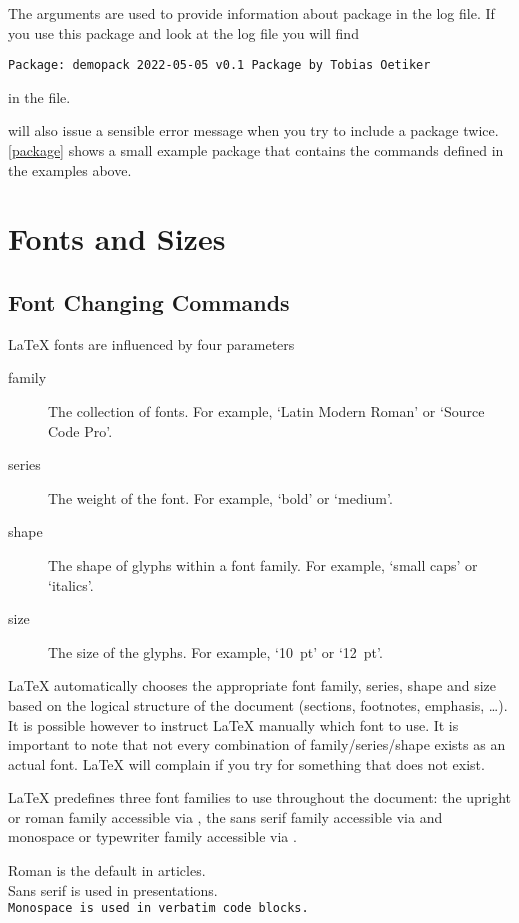 The arguments are used to provide information about package in the log file. If
you use this package and look at the log file you will find
\begin{verbatim}
Package: demopack 2022-05-05 v0.1 Package by Tobias Oetiker
\end{verbatim}
in the  file.

 will also issue a sensible error message when you try
to include a package twice. \autoref{package} shows a small example package
that contains the commands defined in the examples above.

\section{Fonts and Sizes}\label{sec:fontsize}

\subsection{Font Changing Commands}

\LaTeX{} fonts are influenced by four parameters
\begin{description}
  \item[family] The collection of fonts. For example, \enquote*{Latin Modern
      Roman} or \enquote*{Source Code Pro}.
  \item[series] The weight of the font. For example, \enquote*{bold} or
    \enquote*{medium}.
  \item[shape] The shape of glyphs within a font family. For example,
    \enquote*{small caps} or \enquote*{italics}.
  \item[size] The size of the glyphs. For example, \enquote*{\qty{10}{pt}} or
    \enquote*{\qty{12}{pt}}.
\end{description}
\LaTeX{} automatically chooses the appropriate font family, series, shape and
size based on the logical structure of the document (sections, footnotes,
emphasis, \ldots). It is possible however to instruct \LaTeX{} manually which
font to use. It is important to note that not every combination of
family\slash{}series\slash{}shape exists as an actual font. \LaTeX{} will
complain if you try for something that does not exist.

\LaTeX{} predefines three font families to use throughout the document: the
upright or roman family accessible via , the \textsf{sans serif
  family} accessible via  and monospace or typewriter family
accessible via .
\begin{example}
\textrm{Roman is the default
  in articles.} \\
\textsf{Sans serif is used in
  presentations.} \\
\texttt{Monospace is used in
  verbatim code blocks.}
\end{example}

